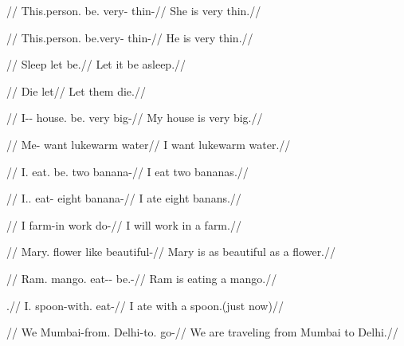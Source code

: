 \documentclass{article}
\begin{document}
\ex
\begingl
\gla{}   \textipa{pa\|[t@\:l-i}//
\glb This.person.\Sg{} be.\Prs{} very-\F{} thin-\F//
\glft She is very thin.//
\endgl
\xe

\ex
\begingl
\gla{}   \textipa{pa\|[t@\:l-a}//
\glb This.person.\Sg{} be.\Prs very-\M{} thin-\M//
\glft He is very thin.//
\endgl
\xe

\ex
\begingl
\gla{} \textipa{\|[de} //
\glb Sleep let be.\Prs//
\glft Let it be asleep.//
\endgl
\xe

\ex
\begingl
\gla{} \textipa{\|[de}//
\glb Die let//
\glft Let them die.//
\endgl
\xe

\ex
\begingl
\gla{}   
//
\glb I-\Gen{}-\M{} house.\M{} be.\Prs{} very big-\M//
\glft My house is very big.//
\endgl
\xe

\ex
\begingl
\gla{}   //
\glb Me-\Dat{} want lukewarm water//
\glft I want lukewarm water.//
\endgl
\xe

\ex
\begingl
\gla{}   \textipa{\|[dui}
//
\glb I.\Sg{} eat.\Ipfv{} be.\Prs{} two banana-\Pl//
\glft I eat two bananas.// 
\endgl
\xe

\ex
\begingl
\gla{}  
//
\glb I.\Sg.\Erg{} eat-\Pfv{} eight banana-\Pl//
\glft I ate eight banans.//
\endgl
\xe

\ex
\begingl
\gla{} \textipa{\t*{ts}\super he\|[t\|[ta-n@} 
//
\glb I farm-in work do-\Fut//
\glft I will work in a farm.//
\endgl
\xe

\ex
\begingl
\gla{}   //
\glb Mary.\Nom{} flower like beautiful-\F//
\glft Mary is as beautiful as a flower.//
\endgl
\xe

\ex
\begingl
\gla{}  \textipa{k\super han-\|[d-a}
//
\glb Ram.\Nom{} mango.\Acc{} eat-\Prs-\M{} be.\Prog-\M//
\glft Ram is eating a mango.//
\endgl
\xe

\ex
\begingl
\gla{}  .//
\glb I.\Erg{} spoon-with.\Ins{} eat-\Pst//
\glft I ate with a spoon.(just now)//
\endgl
\xe

\ex
\begingl
\gla{}  \textipa{\|[dilli-be}
//
\glb We Mumbai-from.\Abl{} Delhi-to.\Acc{} go-\Pl//
\glft We are traveling from Mumbai to Delhi.//
\endgl
\xe
\end{document}
